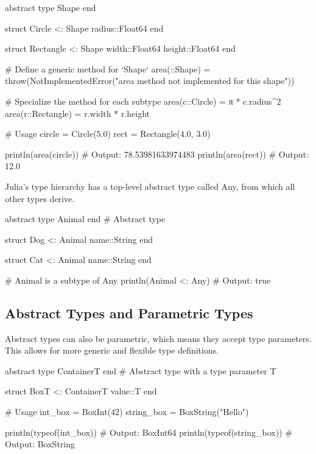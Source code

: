 \documentclass{report}
\begin{document}
     \bigbreak \noindent 
     \begin{jlcode}
 abstract type Shape end

struct Circle <: Shape
    radius::Float64
end

struct Rectangle <: Shape
    width::Float64
    height::Float64
end

# Define a generic method for `Shape`
area(::Shape) = throw(NotImplementedError("area method not implemented for this shape"))

# Specialize the method for each subtype
area(c::Circle) = π * c.radius^2
area(r::Rectangle) = r.width * r.height

# Usage
circle = Circle(5.0)
rect = Rectangle(4.0, 3.0)

println(area(circle))  # Output: 78.53981633974483
println(area(rect))    # Output: 12.0
     \end{jlcode}

     \bigbreak \noindent 
     Julia’s type hierarchy has a top-level abstract type called Any, from which all other types derive.
     \bigbreak \noindent 
     \begin{jlcode}
 abstract type Animal end  # Abstract type

struct Dog <: Animal
    name::String
end

struct Cat <: Animal
    name::String
end

# Animal is a subtype of Any
println(Animal <: Any)  # Output: true
     \end{jlcode}

     \bigbreak \noindent 
     \subsection{Abstract Types and Parametric Types}
     \bigbreak \noindent 
     Abstract types can also be parametric, which means they accept type parameters. This allows for more generic and flexible type definitions.
     \bigbreak \noindent 
     \begin{jlcode}
abstract type Container{T} end  # Abstract type with a type parameter T

struct Box{T} <: Container{T}
    value::T
end

# Usage
int_box = Box{Int}(42)
string_box = Box{String}("Hello")

println(typeof(int_box))  # Output: Box{Int64}
println(typeof(string_box))  # Output: Box{String}
     \end{jlcode}


     \pagebreak 
     \bigbreak \noindent 
\end{document}
